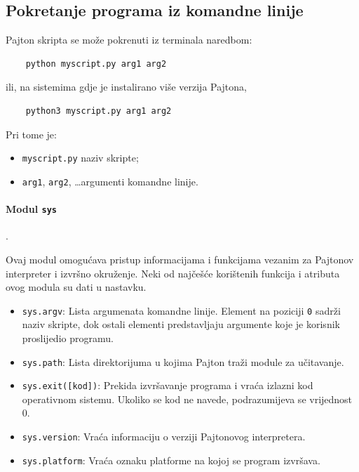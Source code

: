 \subsection*{Pokretanje programa iz komandne linije}

Pajton skripta se može pokrenuti iz terminala naredbom:

\begin{verbatim}
	python myscript.py arg1 arg2
\end{verbatim}

ili, na sistemima gdje je instalirano više verzija Pajtona,

\begin{verbatim}
	python3 myscript.py arg1 arg2
\end{verbatim}

Pri tome je:

\begin{itemize}
	\item \texttt{myscript.py} naziv skripte;
	\item \texttt{arg1}, \texttt{arg2}, \ldots argumenti komandne linije.
\end{itemize}

\paragraph{Modul \texttt{sys}}. 

Ovaj modul omogućava pristup informacijama i funkcijama vezanim za Pajtonov interpreter i izvršno okruženje. Neki od najčešće korištenih funkcija i atributa ovog modula su dati u nastavku.

\begin{itemize}
	
	\item \texttt{sys.argv}:  Lista argumenata komandne linije. Element na poziciji \texttt{0} sadrži naziv skripte, dok ostali elementi predstavljaju argumente koje je korisnik proslijedio programu.
	
	\item \texttt{sys.path}: Lista direktorijuma u kojima Pajton traži module za učitavanje.
	
	\item \texttt{sys.exit([kod])}:  Prekida izvršavanje programa i vraća izlazni kod operativnom sistemu. Ukoliko se kod ne navede, podrazumijeva se vrijednost 0.
	
	\item \texttt{sys.version}: Vraća informaciju o verziji Pajtonovog interpretera.
	
	\item \texttt{sys.platform}: Vraća oznaku platforme na kojoj se program izvršava.
	
\end{itemize}


